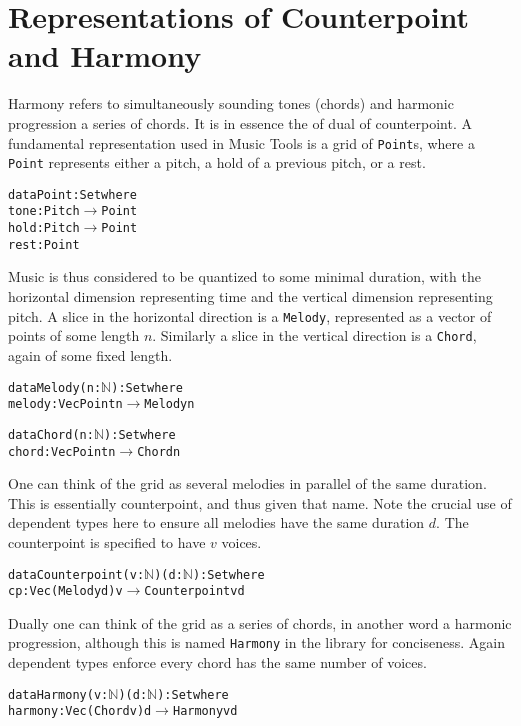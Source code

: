 \section{Representations of Counterpoint and Harmony}
\label{sec:cpharmony}

Harmony refers to simultaneously sounding tones (chords) and harmonic progression
a series of chords. It is in essence the of dual of counterpoint. A
fundamental representation used in Music Tools is a grid of
\texttt{Point}s, where a \texttt{Point} represents either a pitch, a
hold of a previous pitch, or a rest.

\begin{alltt}
data Point : Set where
  tone : Pitch \(\rightarrow\) Point
  hold : Pitch \(\rightarrow\) Point
  rest : Point
\end{alltt}

Music is thus considered to be quantized to some minimal duration,
with the horizontal dimension representing time and the vertical
dimension representing pitch. A slice in the horizontal direction is a
\texttt{Melody}, represented as a vector of points of some length $n$. Similarly a slice
in the vertical direction is a \texttt{Chord}, again of some fixed length.

\begin{alltt}
data Melody (n : \(\mathbb{N}\)) : Set where
  melody : Vec Point n \(\rightarrow\) Melody n

data Chord (n : \(\mathbb{N}\)) : Set where
  chord : Vec Point n \(\rightarrow\) Chord n
\end{alltt}

One can think of the grid as several melodies in parallel of the same
duration. This is essentially counterpoint, and thus given that
name. Note the crucial use of dependent types here to ensure all
melodies have the same duration $d$. The counterpoint is specified to
have $v$ voices.

\begin{alltt}
data Counterpoint (v : \(\mathbb{N}\)) (d : \(\mathbb{N}\)): Set where
  cp : Vec (Melody d) v \(\rightarrow\) Counterpoint v d
\end{alltt}

Dually one can think of the grid as a series of chords, in another
word a harmonic progression, although this is named \texttt{Harmony}
in the library for conciseness. Again dependent types enforce every
chord has the same number of voices.

\begin{alltt}
data Harmony (v : \(\mathbb{N}\)) (d : \(\mathbb{N}\)): Set where
  harmony : Vec (Chord v) d \(\rightarrow\) Harmony v d
\end{alltt}

